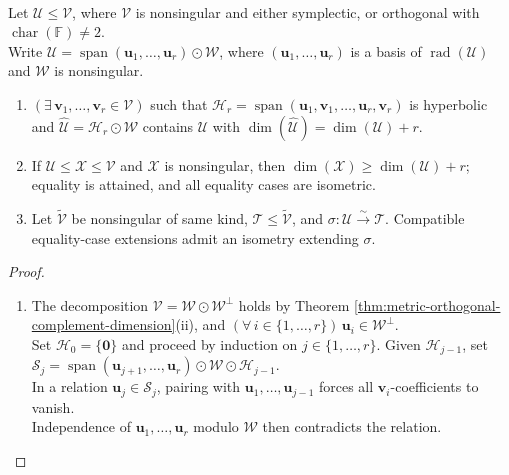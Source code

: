 \begin{theorem} \label{thm:nonsingular-completions-hyperbolic-extensions} \\
Let $\mathcal{U}\leq\mathcal{V}$, where $\mathcal{V}$ is nonsingular and either symplectic, or orthogonal with $\operatorname{char}(\mathbb{F})\neq2$.\\
Write $\mathcal{U}=\operatorname{span}(\mathbf{u}_1,\ldots,\mathbf{u}_r)\odot\mathcal{W}$, where $(\mathbf{u}_1,\ldots,\mathbf{u}_r)$ is a basis of $\operatorname{rad}(\mathcal{U})$ and $\mathcal{W}$ is nonsingular.
\begin{enumerate}[label=(\roman*)]
\setlength{\itemsep}{0pt}
\item $(\exists\,\mathbf{v}_1,\ldots,\mathbf{v}_r\in\mathcal{V})$ such that $\mathcal{H}_r=\operatorname{span}(\mathbf{u}_1,\mathbf{v}_1,\ldots,\mathbf{u}_r,\mathbf{v}_r)$ is hyperbolic and $\widehat{\mathcal{U}}=\mathcal{H}_r\odot\mathcal{W}$ contains $\mathcal{U}$ with $\dim(\widehat{\mathcal{U}})=\dim(\mathcal{U})+r$.
\item If $\mathcal{U}\leq\mathcal{X}\leq\mathcal{V}$ and $\mathcal{X}$ is nonsingular, then $\dim(\mathcal{X})\geq\dim(\mathcal{U})+r$; equality is attained, and all equality cases are isometric.
\item Let $\widetilde{\mathcal{V}}$ be nonsingular of same kind, $\mathcal{T}\leq\widetilde{\mathcal{V}}$, and $\sigma:\mathcal{U}\xrightarrow{\sim}\mathcal{T}$. Compatible equality-case extensions admit an isometry extending $\sigma$.
\end{enumerate}
\begin{proof}
\begin{enumerate}[label=(\roman*)]
\setlength{\itemsep}{0pt}
\item[$(i)$] The decomposition $\mathcal{V}=\mathcal{W}\odot\mathcal{W}^{\perp}$ holds by Theorem \ref{thm:metric-orthogonal-complement-dimension}(ii), and $(\forall\,i\in\{1,\ldots,r\})\,\mathbf{u}_i\in\mathcal{W}^{\perp}$.\\
Set $\mathcal{H}_0=\{\mathbf{0}\}$ and proceed by induction on $j\in\{1,\ldots,r\}$. Given $\mathcal{H}_{j-1}$, set $\mathcal{S}_j=\operatorname{span}(\mathbf{u}_{j+1},\ldots,\mathbf{u}_r)\odot\mathcal{W}\odot\mathcal{H}_{j-1}$.\\
In a relation $\mathbf{u}_j\in\mathcal{S}_j$, pairing with $\mathbf{u}_1,\ldots,\mathbf{u}_{j-1}$ forces all $\mathbf{v}_i$-coefficients to vanish.\\
Independence of $\mathbf{u}_1,\ldots,\mathbf{u}_r$ modulo $\mathcal{W}$ then contradicts the relation.\\

\end{enumerate}
\end{proof}
\end{theorem}
